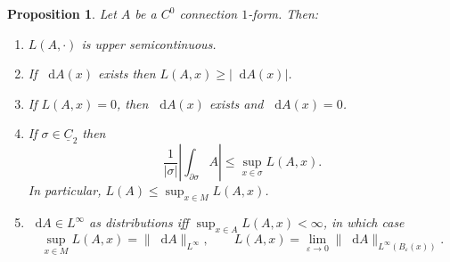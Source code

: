 \documentclass[reqno,11pt]{amsart}
\newcommand*\dif{\mathop{}\!\mathrm{d}}
\newcommand{\Chain}{\underline C}
\newtheorem{proposition}[theorem]{Proposition}
\theoremstyle{definition}
\numberwithin{equation}{section}
\begin{document}
\begin{proposition}\label{crandall}
Let $A$ be a $C^0$ connection $1$-form. Then:
\begin{enumerate}
\item $L(A, \cdot)$ is upper semicontinuous. \label{crandall usc}
\item If $\dif A(x)$ exists then $L(A, x) \geq |\dif A(x)|$. \label{crandall dA bounds LA}
\item If $L(A, x) = 0$, then $\dif A(x)$ exists and $\dif A(x) = 0$. \label{crandall zero LA implies diffble}
\item If $\sigma \in \Chain_2$ then
$$\frac{1}{|\sigma|} \left|\int_{\partial \sigma} A\right| \leq \sup_{x \in \sigma} L(A, x).$$
In particular, $L(A) \leq \sup_{x \in M} L(A, x)$. \label{crandall best curl is ABC}
\item $\dif A \in L^\infty$ as distributions iff $\sup_{x \in A} L(A, x) < \infty$, in which case \label{crandall linfinity}
$$\sup_{x \in M} L(A, x) = \|\dif A\|_{L^\infty}, \qquad L(A, x) = \lim_{\varepsilon \to 0} \|\dif A\|_{L^\infty(B_\varepsilon(x))}.$$
\end{enumerate}
\end{proposition}
\end{document}
